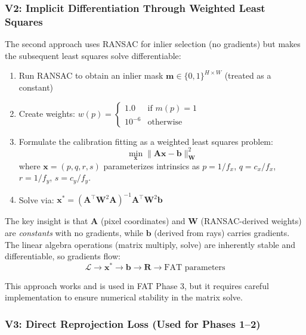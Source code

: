 \subsubsection{V2: Implicit Differentiation Through Weighted Least Squares}

The second approach uses RANSAC for inlier selection (no gradients) but makes the subsequent least squares solve differentiable:

\begin{enumerate}
    \item Run RANSAC to obtain an inlier mask $\mathbf{m} \in \{0,1\}^{H \times W}$ (treated as a constant)
    \item Create weights: $w(p) = \begin{cases} 1.0 & \text{if } m(p) = 1 \\ 10^{-6} & \text{otherwise} \end{cases}$
    \item Formulate the calibration fitting as a weighted least squares problem:
    \begin{equation}
        \min_{\mathbf{x}} \|\mathbf{A}\mathbf{x} - \mathbf{b}\|_{\mathbf{W}}^2
    \end{equation}
    where $\mathbf{x} = (p, q, r, s)$ parameterizes intrinsics as $p = 1/f_x$, $q = c_x/f_x$, $r = 1/f_y$, $s = c_y/f_y$.
    \item Solve via: $\mathbf{x}^* = (\mathbf{A}^\top \mathbf{W}^2 \mathbf{A})^{-1} \mathbf{A}^\top \mathbf{W}^2 \mathbf{b}$
\end{enumerate}

The key insight is that $\mathbf{A}$ (pixel coordinates) and $\mathbf{W}$ (RANSAC-derived weights) are \emph{constants} with no gradients, while $\mathbf{b}$ (derived from rays) carries gradients. The linear algebra operations (matrix multiply, solve) are inherently stable and differentiable, so gradients flow:
\begin{equation}
    \mathcal{L} \to \mathbf{x}^* \to \mathbf{b} \to \mathbf{R} \to \text{FAT parameters}
\end{equation}

This approach works and is used in FAT Phase 3, but it requires careful implementation to ensure numerical stability in the matrix solve.

\subsubsection{V3: Direct Reprojection Loss (Used for Phases 1--2)}

